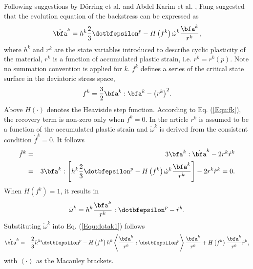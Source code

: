 Following suggestions by D\"orring et al. \cite{Doerring2003} and Abdel Karim et al. \cite{AbdelKarim20051303}, Fang \cite{fang2015cyclic} suggested that the evolution equation of the backstress can be expressed as
\begin{equation}
\label{Equ:dotak1}
{\dot\bfa^k} = {h^k}\frac{2}{3}{\dotbfepsilon^p} - H\left( {{f^k}} \right){\dot \omega ^k}\frac{{{\bfa^k}}}{{{r^k}}},
\end{equation}
where ${{{h}}^k} $ and ${{{r}}^k} $ are the state variables introduced to describe cyclic plasticity of the material, $r^k$ is a function of accumulated plastic strain, i.e. ${r^k} = {r^k}\left( p \right)$.  Note no summation convention is applied for $k$. ${{{f}}^k} $ defines a series of the critical state surface in the deviatoric stress space,
\begin{equation}
\label{Equ:fk}
{f^k} = \frac{3}{2}{\bfa^k}:{\bfa^k} - {\left( {{r^k}} \right)^2}.
\end{equation}
Above  $H(\cdot)$ denotes the Heaviside step function. According to Eq. (\ref{Equ:fk}), the recovery term is non-zero only when ${f^k} = 0$. In the article $r^k$ is assumed to be a function of the accumulated plastic strain and ${\dot \omega ^k}$ is derived from the consistent condition ${\dot f^k} = 0$. It follows
\begin{eqnarray}
\label{Equ:dotfk}
{\dot f^k} &=& 3{\bfa^k}:{\dot\bfa^k} - 2{r^k}{\dot r^k} \\ \nonumber
&=& 3{\bfa^k}:\left[ {{h^k}\frac{2}{3}{{\dotbfepsilon}^p} - H\left( {{f^k}} \right){{\dot \omega }^k}\frac{{{\bfa^k}}}{{{r^k}}}} \right] - 2{r^k}{\dot r^k} = 0.
\end{eqnarray}
When $H\left( {{f^k}} \right) = 1$, it results in
\begin{equation}
\label{Equ:dotomegak}
{\dot \omega ^k} = {h^k}\frac{{{\bfa^k}}}{{{r^k}}}:{\dotbfepsilon^p} - {\dot r^k}.
\end{equation}
Substituting ${\dot \omega ^k}$ into Eq. (\ref{Equ:dotak1}) follows
\begin{eqnarray}
\label{Equ:dotak2}
{\dot\bfa^k} &=& \frac{2}{3}{h^k}{\dotbfepsilon^p} - H\left( {{f^k}} \right){h^k}\left\langle {\frac{{{\bfa^k}}}{{{r^k}}}:{{\dotbfepsilon}^p}} \right\rangle \frac{{{\bfa^k}}}{{{r^k}}} + H\left( {{f^k}} \right)\frac{{{\bfa^k}}}{{{r^k}}}{\dot r^k},
\end{eqnarray}
with $\left<\cdot\right>$ as the Macauley brackets.


